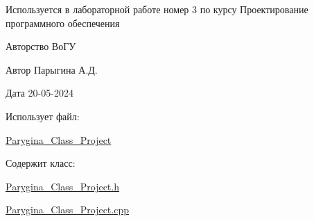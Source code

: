 Используется в лабораторной работе номер 3 по курсу Проектирование программного обеспечения \begin{DoxyCopyright}{Авторство}
ВоГУ 
\end{DoxyCopyright}
\begin{DoxyAuthor}{Автор}
Парыгина А.\+Д. 
\end{DoxyAuthor}
\begin{DoxyDate}{Дата}
20-\/05-\/2024 
\end{DoxyDate}
\begin{DoxyParagraph}{Использует файл\+:}

\begin{DoxyItemize}
\item \hyperlink{class_parygina___class___project}{Parygina\+\_\+\+Class\+\_\+\+Project} 
\end{DoxyItemize}
\end{DoxyParagraph}
\begin{DoxyParagraph}{Содержит класс\+:}

\begin{DoxyItemize}
\item \hyperlink{_parygina___class___project_8h}{Parygina\+\_\+\+Class\+\_\+\+Project.\+h}
\item \hyperlink{_parygina___class___project_8cpp}{Parygina\+\_\+\+Class\+\_\+\+Project.\+cpp} 
\end{DoxyItemize}
\end{DoxyParagraph}
